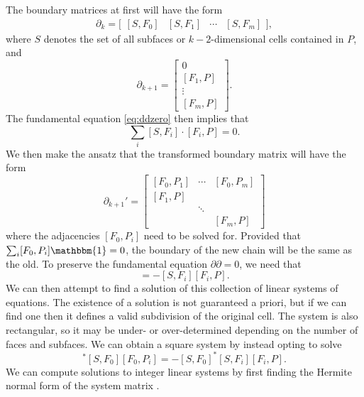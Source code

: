 \documentclass[twocolumn]{article}
\begin{document}
The boundary matrices at first will have the form
\begin{equation}
    \partial_k = \Big[\begin{matrix}[S, F_0] & [S, F_1] & \cdots & [S, F_m]\end{matrix}\Big],
\end{equation}
where $S$ denotes the set of all subfaces or $k - 2$-dimensional cells contained in $P$, and
\begin{equation}
    \partial_{k + 1} = \left[\begin{matrix} 0 \\ [F_1, P] \\ \vdots \\ [F_m, P]\end{matrix}\right].
\end{equation}
The fundamental equation \eqref{eq:ddzero} then implies that
\begin{equation}
    \sum_i[S, F_i]\cdot[F_i, P] = 0.
\end{equation}
We then make the ansatz that the transformed boundary matrix will have the form
\begin{equation}
    \partial_{k + 1}' = \left[\begin{matrix}[F_0, P_1] & \cdots & [F_0, P_m] \\ [F_1, P] & & \\ & \ddots & \\ & & [F_m, P]\end{matrix}\right]
\end{equation}
where the adjacencies $[F_0, P_i]$ need to be solved for.
Provided that $\sum_i[F_0, P_i]\mathbbm{1} = 0$, the boundary of the new chain will be the same as the old.
To preserve the fundamental equation $\partial\partial = 0$, we need that
\begin{equation}
    [S, F_0][F_0, P_i] = -[S, F_i][F_i, P].
\end{equation}
We can then attempt to find a solution of this collection of linear systems of equations.
The existence of a solution is not guaranteed a priori, but if we can find one then it defines a valid subdivision of the original cell.
The system is also rectangular, so it may be under- or over-determined depending on the number of faces and subfaces.
We can obtain a square system by instead opting to solve
\begin{equation}
    [S, F_0]^*[S, F_0][F_0, P_i] = -[S, F_0]^*[S, F_i][F_i, P].
\end{equation}
We can compute solutions to integer linear systems by first finding the Hermite normal form of the system matrix \cite{kannan1979polynomial}.
\end{document}
